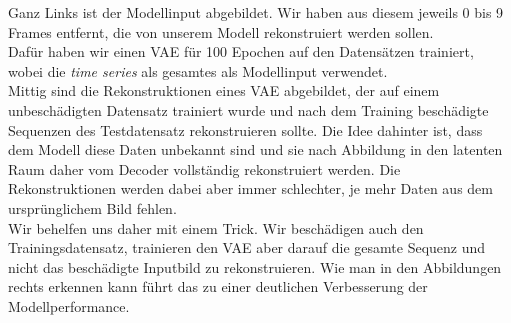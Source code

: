 \documentclass[12pt]{article}
\begin{document}
	Ganz Links ist der Modellinput abgebildet. Wir haben aus diesem jeweils 0 bis 9 Frames entfernt, die von unserem Modell rekonstruiert werden sollen.\\
	Dafür haben wir einen VAE für 100 Epochen auf den Datensätzen trainiert, wobei die \emph{time series} als gesamtes als Modellinput verwendet.\\
	Mittig sind die Rekonstruktionen eines VAE abgebildet, der auf einem unbeschädigten Datensatz trainiert wurde und nach dem Training beschädigte Sequenzen des Testdatensatz rekonstruieren sollte. Die Idee dahinter ist, dass dem Modell diese Daten unbekannt sind und sie nach Abbildung in den latenten Raum daher vom Decoder vollständig rekonstruiert werden.
	Die Rekonstruktionen werden dabei aber immer schlechter, je mehr Daten aus dem ursprünglichem Bild fehlen. \\
	Wir behelfen uns daher mit einem Trick. Wir beschädigen auch den Trainingsdatensatz, trainieren den VAE aber darauf die gesamte Sequenz und nicht das beschädigte Inputbild zu rekonstruieren. Wie man in den Abbildungen rechts erkennen kann führt das zu einer deutlichen Verbesserung der Modellperformance.\\



\end{document}
